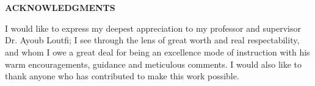 \newenvironment{acknowledgments}
{%
    \thispagestyle{empty}%
    \vspace*{\stretch{2}}%
    \centering
    \justifying      %
}
{\par %
    \vspace{\stretch{3}} %
    \clearpage           %
}

\section*{}
\begin{acknowledgments}
    \begin{center}
        {\textbf{ACKNOWLEDGMENTS}}
    \end{center}
    I would like to express my deepest appreciation to my professor and supervisor Dr. Ayoub
    Loutfi; I see through the lens of great worth and real respectability, and whom I
    owe a great deal for being an excellence mode of instruction with his warm encouragements,
    guidance and meticulous comments. I would also like to thank anyone who has contributed to make this work possible.
\end{acknowledgments}

